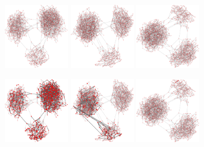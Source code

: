\begin{figure}
\centering
\includegraphics[width=0.25\textwidth]{batchRun__kHalf=2-2-2_maxUpdate=0.08_noize=0_nbrDepth=2/network0-crop.pdf}
\hfill
\includegraphics[width=0.25\textwidth]{batchRun__kHalf=2-2-2_maxUpdate=0.08_noize=0_nbrDepth=2_fixedthreshold=0.4/network0-crop.pdf}
\hfill
\includegraphics[width=0.25\textwidth]{batchRun__kHalf=2-2-2_maxUpdate=0.08_noize=0_nbrDepth=2_fixedthreshold=0.2/network0-crop.pdf}

\includegraphics[width=0.25\textwidth]{batchRun__kHalf=2-2-2_maxUpdate=0.08_noize=0_nbrDepth=2/network250-crop.pdf}
\hfill
\includegraphics[width=0.25\textwidth]{batchRun__kHalf=2-2-2_maxUpdate=0.08_noize=0_nbrDepth=2_fixedthreshold=0.4/network250-crop.pdf}
\hfill
\includegraphics[width=0.25\textwidth]{batchRun__kHalf=2-2-2_maxUpdate=0.08_noize=0_nbrDepth=2_fixedthreshold=0.2/network250-crop.pdf}


\end{figure}
